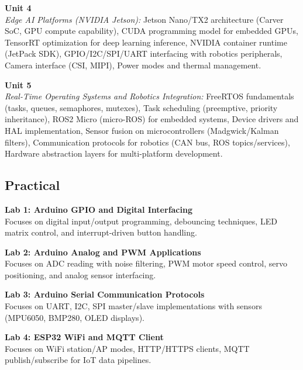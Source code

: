\noindent\textbf{Unit 4} \\
\textit{Edge AI Platforms (NVIDIA Jetson):} Jetson Nano/TX2 architecture (Carver SoC, GPU compute capability), CUDA programming model for embedded GPUs, TensorRT optimization for deep learning inference, NVIDIA container runtime (JetPack SDK), GPIO/I2C/SPI/UART interfacing with robotics peripherals, Camera interface (CSI, MIPI), Power modes and thermal management.

\vspace{0.3cm}

\noindent\textbf{Unit 5} \\
\textit{Real-Time Operating Systems and Robotics Integration:} FreeRTOS fundamentals (tasks, queues, semaphores, mutexes), Task scheduling (preemptive, priority inheritance), ROS2 Micro (micro-ROS) for embedded systems, Device drivers and HAL implementation, Sensor fusion on microcontrollers (Madgwick/Kalman filters), Communication protocols for robotics (CAN bus, ROS topics/services), Hardware abstraction layers for multi-platform development.

\newpage

\subsection*{Practical}
\noindent\textbf{Lab 1: Arduino GPIO and Digital Interfacing} \\
Focuses on digital input/output programming, debouncing techniques, LED matrix control, and interrupt-driven button handling.

\vspace{0.2cm}

\noindent\textbf{Lab 2: Arduino Analog and PWM Applications} \\
Focuses on ADC reading with noise filtering, PWM motor speed control, servo positioning, and analog sensor interfacing.

\vspace{0.2cm}

\noindent\textbf{Lab 3: Arduino Serial Communication Protocols} \\
Focuses on UART, I2C, SPI master/slave implementations with sensors (MPU6050, BMP280, OLED displays).

\vspace{0.2cm}

\noindent\textbf{Lab 4: ESP32 WiFi and MQTT Client} \\
Focuses on WiFi station/AP modes, HTTP/HTTPS clients, MQTT publish/subscribe for IoT data pipelines.

